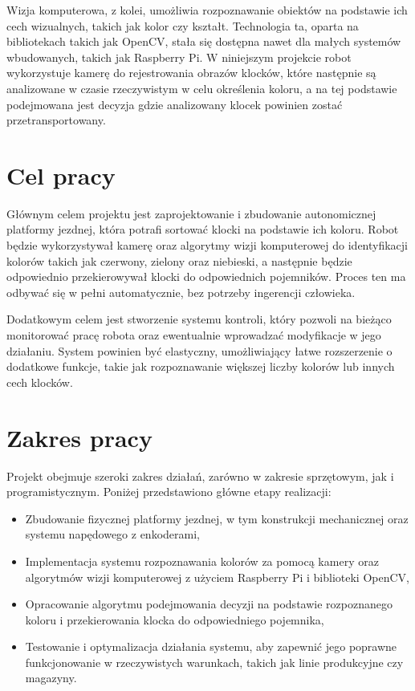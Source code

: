 Wizja komputerowa, z kolei, umożliwia rozpoznawanie obiektów na podstawie ich cech wizualnych, takich jak kolor czy kształt. Technologia ta, oparta na bibliotekach takich jak OpenCV, stała się dostępna nawet dla małych systemów wbudowanych, takich jak Raspberry Pi. W niniejszym projekcie robot wykorzystuje kamerę do rejestrowania obrazów klocków, które następnie są analizowane w czasie rzeczywistym w celu określenia koloru, a na tej podstawie podejmowana jest decyzja gdzie analizowany klocek powinien zostać przetransportowany.

\section{Cel pracy}
\label{sec:cel}

Głównym celem projektu jest zaprojektowanie i zbudowanie autonomicznej platformy jezdnej, która potrafi sortować klocki na podstawie ich koloru. Robot będzie wykorzystywał kamerę oraz algorytmy wizji komputerowej do identyfikacji kolorów takich jak czerwony, zielony oraz niebieski, a następnie będzie odpowiednio przekierowywał klocki do odpowiednich pojemników. Proces ten ma odbywać się w pełni automatycznie, bez potrzeby ingerencji człowieka.

Dodatkowym celem jest stworzenie systemu kontroli, który pozwoli na bieżąco monitorować pracę robota oraz ewentualnie wprowadzać modyfikacje w jego działaniu. System powinien być elastyczny, umożliwiający łatwe rozszerzenie o dodatkowe funkcje, takie jak rozpoznawanie większej liczby kolorów lub innych cech klocków.

\section{Zakres pracy}
\label{sec:zakres}

Projekt obejmuje szeroki zakres działań, zarówno w zakresie sprzętowym, jak i programistycznym. Poniżej przedstawiono główne etapy realizacji:

\begin{itemize}
    \item Zbudowanie fizycznej platformy jezdnej, w tym konstrukcji mechanicznej oraz systemu napędowego z enkoderami,
    \item Implementacja systemu rozpoznawania kolorów za pomocą kamery oraz algorytmów wizji komputerowej z użyciem Raspberry Pi i biblioteki OpenCV,
    \item Opracowanie algorytmu podejmowania decyzji na podstawie rozpoznanego koloru i przekierowania klocka do odpowiedniego pojemnika,
    \item Testowanie i optymalizacja działania systemu, aby zapewnić jego poprawne funkcjonowanie w rzeczywistych warunkach, takich jak linie produkcyjne czy magazyny.
\end{itemize}

